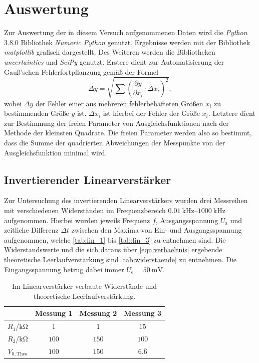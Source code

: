 \section{Auswertung}
Zur Auswertung der in diesem Versuch aufgenommenen Daten wird die \textit{Python} 3.8.0 Bibliothek
\textit{Numeric Python} \cite{numpy} genutzt. Ergebnisse werden mit der Bibliothek \textit{matplotlib} \cite{matplotlib} grafisch
dargestellt. Des Weiteren werden die Bibliotheken \textit{uncertainties} \cite{uncertainties} und \textit{SciPy} \cite{scipy} genutzt. Erstere dient zur Automatisierung der Gauß'schen Fehlerfortpflanzung gemäß der Formel
\begin{equation*}
  \Delta y = \sqrt{\sum \left(\frac{\partial y}{\partial x_i}\cdot \Delta x_i \right)^2},
\end{equation*}
wobei $\Delta y$ der Fehler einer aus mehreren fehlerbehafteten Größen $x_i$ zu bestimmenden Größe $y$ ist. $\Delta x_i$ ist hierbei der Fehler der Größe $x_i$. Letztere dient zur Bestimmung der freien Parameter von Ausgleichsfunktionen nach der Methode der kleinsten Quadrate. Die freien Parameter werden also so bestimmt, dass die Summe der quadrierten Abweichungen der Messpunkte von der Ausgleichsfunktion minimal wird.

\newpage
\subsection{Invertierender Linearverstärker}
Zur Untersuchung des invertierenden Linearverstärkers wurden drei Messreihen mit verschiedenen Widerständen im Frequenzbereich $\SIrange{0.01}{1000}{\kilo\hertz}$ aufgenommen. Hierbei wurden jeweils Frequenz $f$, Ausgangsspannung $U_\mathrm{a}$ und zeitliche Differenz $\Delta t$ zwischen den Maxima von Ein- und Ausgangsspannung aufgenommen, welche \autoref{tab:lin_1} bis \ref{tab:lin_3} zu entnehmen sind. Die Widerstandswerte und die sich daraus über \autoref{eqn:verhaeltnis} ergebende theoretische Leerlaufverstärkung sind \autoref{tab:widerstaende} zu entnehmen. Die Eingangsspannung betrug dabei immer $U_\mathrm{e} = \SI{50}{\milli\volt}$.

\begin{table}[H]
  \centering
  \caption{Im Linearverstärker verbaute Widerstände und theoretische Leerlaufverstärkung.}
  \begin{tabular}{c c c c}
    \toprule
    & Messung 1 & Messung 2 & Messung 3\\
    \midrule
    $R_1$/$\si{\kilo\ohm}$ & $\num{1}$ & $\num{1}$ & $\num{15}$\\
    $R_2$/$\si{\kilo\ohm}$ & $\num{100}$ & $\num{150}$ & $\num{100}$\\
    $V_{0,\mathrm{Theo}}$ & $\num{100}$ & $\num{150}$ & $6.\bar{6}$\\
    \bottomrule
  \end{tabular}
  \label{tab:widerstaende}
\end{table}

